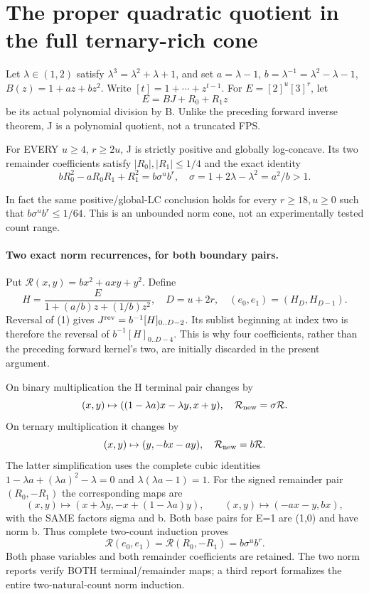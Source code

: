 \section{The proper quadratic quotient in the full ternary-rich cone}
Let $\lambda\in(1,2)$ satisfy $\lambda^3=\lambda^2+\lambda+1$,
and set $a=\lambda-1$, $b=\lambda^{-1}=\lambda^2-\lambda-1$,
$B(z)=1+az+bz^2$. Write $[t]=1+\cdots+z^{t-1}$.
For $E=[2]^u[3]^r$, let
\[
                         E=BJ+R_0+R_1z                 \tag{1}
\]
be its actual polynomial division by B. Unlike the preceding forward
inverse theorem, J is a polynomial quotient, not a truncated FPS.

\begin{theorem}
For EVERY $u\ge4$, $r\ge2u$, J is strictly positive and globally
log-concave. Its two remainder coefficients satisfy
$|R_0|,|R_1|\le1/4$ and the exact identity
\[
 bR_0^2-aR_0R_1+R_1^2
       =b\sigma^u b^r,
 \quad\sigma=1+2\lambda-\lambda^2=a^2/b>1.         \tag{2}
\]
\end{theorem}
In fact the same positive/global-LC conclusion holds for every
$r\ge18,u\ge0$ such that $b\sigma^u b^r\le1/64$.
This is an unbounded norm cone, not an experimentally tested count range.

\paragraph{Two exact norm recurrences, for both boundary pairs.}
Put $\mathcal R(x,y)=bx^2+axy+y^2$. Define
\[
 H=\frac{E}{1+(a/b)z+(1/b)z^2},\quad D=u+2r,
 \quad(e_0,e_1)=(H_D,H_{D-1}).
\]
Reversal of (1) gives
$J^{\rm rev}=b^{-1}[H]_{0..D-2}$. Its sublist beginning at
index two is therefore the reversal of $b^{-1}[H]_{0..D-4}$.
This is why four coefficients, rather than the preceding forward
kernel's two, are initially discarded in the present argument.

On binary multiplication the H terminal pair changes by
\[
 (x,y)\mapsto((1-\lambda a)x-\lambda y,x+y),
                        \quad\mathcal R_{\rm new}=\sigma\mathcal R.
\]
On ternary multiplication it changes by
\[
              (x,y)\mapsto(y,-bx-ay),
                        \quad\mathcal R_{\rm new}=b\mathcal R.
\]
The latter simplification uses the complete cubic identities
$1-\lambda a+(\lambda a)^2-\lambda=0$ and
$\lambda(\lambda a-1)=1$.
For the signed remainder pair $(R_0,-R_1)$ the corresponding maps are
\[
 (x,y)\mapsto(x+\lambda y,-x+(1-\lambda a)y),
 \qquad (x,y)\mapsto(-ax-y,bx),
\]
with the SAME factors sigma and b. Both base pairs for E=1 are (1,0)
and have norm b. Thus complete two-count induction proves
\[
 \mathcal R(e_0,e_1)=\mathcal R(R_0,-R_1)=b\sigma^u b^r. \tag{3}
\]
Both phase variables and both remainder coefficients are retained.
The two norm reports verify BOTH terminal/remainder maps; a third
report formalizes the entire two-natural-count norm induction.


